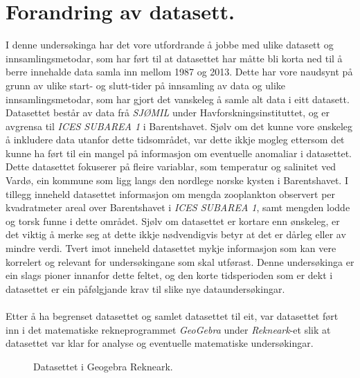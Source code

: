 \documentclass{report}
\begin{document}
\section{Forandring av datasett.}
I denne undersøkinga har det vore utfordrande å jobbe med ulike datasett og innsamlingsmetodar, som har ført til at datasettet har måtte bli korta ned til å berre innehalde data samla inn mellom 1987 og 2013. Dette har vore naudsynt på grunn av ulike start- og slutt-tider på innsamling av data og ulike innsamlingsmetodar, som har gjort det vanskeleg å samle alt data i eitt datasett. Datasettet består av data frå \textit{SJØMIL} under Havforskningsinstituttet, og er avgrensa til \textit{ICES SUBAREA 1} i Barentshavet. Sjølv om det kunne vore ønskeleg å inkludere data utanfor dette tidsområdet, var dette ikkje mogleg ettersom det kunne ha ført til ein mangel på informasjon om eventuelle anomaliar i datasettet.
Dette datasettet fokuserer på fleire variablar, som temperatur og salinitet ved Vardø, ein kommune som ligg langs den nordlege norske kysten i Barentshavet. I tillegg inneheld datasettet informasjon om mengda zooplankton observert per kvadratmeter areal over Barentshavet i \textit{ICES SUBAREA 1}, samt mengden lodde og torsk funne i dette området.
Sjølv om datasettet er kortare enn ønskeleg, er det viktig å merke seg at dette ikkje nødvendigvis betyr at det er dårleg eller av mindre verdi. Tvert imot inneheld datasettet mykje informasjon som kan vere korrelert og relevant for undersøkingane som skal utførast. Denne undersøkinga er ein slags pioner innanfor dette feltet, og den korte tidsperioden som er dekt i datasettet er ein påfølgjande krav til slike nye dataundersøkingar. \\
\\
Etter å ha begrenset datasettet og samlet datasettet til eit, var datasettet ført inn i det matematiske rekneprogrammet \textit{GeoGebra} under \textit{Rekneark}-et slik at datasettet var klar for analyse og eventuelle matematiske undersøkingar.
\begin{figure}[H]
	\centering
	\caption{Datasettet i Geogebra Rekneark.}
	\label{F2}
\end{figure}\newpage
\end{document}
